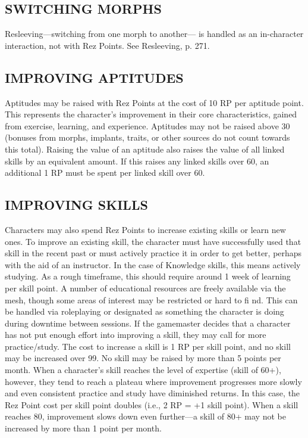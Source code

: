 \subsection{SWITCHING MORPHS}
Resleeving—switching from one morph to another— is handled as an in-character
interaction, not with Rez Points. See Resleeving, p. 271.

\subsection{IMPROVING APTITUDES}
Aptitudes may be raised with Rez Points at the cost of 10 RP per aptitude
point. This represents the character’s improvement in their core
characteristics, gained from exercise, learning, and experience. Aptitudes may
not be raised above 30 (bonuses from morphs, implants, traits, or other sources
do not count towards this total).  Raising the value of an aptitude also raises
the value of all linked skills by an equivalent amount. If this raises any
linked skills over 60, an additional 1 RP must be spent per linked skill over
60.

\subsection{IMPROVING SKILLS}
Characters may also spend Rez Points to increase existing skills or learn new
ones. To improve an existing skill, the character must have successfully used
that skill in the recent past or must actively practice it in order to get
better, perhaps with the aid of an instructor. In the case of Knowledge skills,
this means actively studying. As a rough timeframe, this should require around
1 week of learning per skill point. A number of educational resources are
freely available via the mesh, though some areas of interest may be restricted
or hard to fi nd. This can be handled via roleplaying or designated as
something the character is doing during downtime between sessions. If the
gamemaster decides that a character has not put enough effort into improving a
skill, they may call for more practice/study.  The cost to increase a skill is
1 RP per skill point, and no skill may be increased over 99.  No skill may be
raised by more than 5 points per month. When a character’s skill reaches the
level of expertise (skill of 60+), however, they tend to reach a plateau where
improvement progresses more slowly and even consistent practice and study have
diminished returns.  In this case, the Rez Point cost per skill point doubles
(i.e., 2 RP = +1 skill point).  When a skill reaches 80, improvement slows down
even further—a skill of 80+ may not be increased by more than 1 point per
month.

